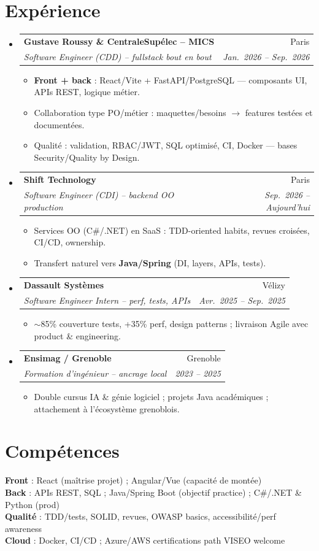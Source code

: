 \documentclass[a4paper,10.5pt]{article}
\makeatletter
\newcommand{\resumeItem}[1]{\item\small{#1}}
\newcommand{\resumeSubheading}[4]{\vspace{3pt}\item\begin{tabular*}{0.97\textwidth}[t]{l@{\extracolsep{\fill}}r}\textbf{#1}&{#2}\\\textit{\small #3}&\textit{\small #4}\\\end{tabular*}\vspace{1pt}}
\newcommand{\resumeSubHeadingListStart}{\begin{itemize}[leftmargin=0.08in,label={}]}
\newcommand{\resumeSubHeadingListEnd}{\end{itemize}}
\makeatother
\begin{document}
\section{Exp\'erience}
\resumeSubHeadingListStart
  \resumeSubheading
    {Gustave Roussy \& CentraleSup\'elec -- MICS}{Paris}
    {Software Engineer (CDD) -- fullstack bout en bout}{Jan.~2026 -- Sep.~2026}
    \begin{itemize}
      \resumeItem{\textbf{Front + back} : React/Vite + FastAPI/PostgreSQL --- composants UI, APIs REST, logique m\'etier.}
      \resumeItem{Collaboration type PO/m\'etier : maquettes/besoins $\rightarrow$ features test\'ees et document\'ees.}
      \resumeItem{Qualit\'e : validation, RBAC/JWT, SQL optimis\'e, CI, Docker --- bases Security/Quality by Design.}
    \end{itemize}
  \resumeSubheading
    {Shift Technology}{Paris}
    {Software Engineer (CDI) -- backend OO production}{Sep.~2026 -- Aujourd'hui}
    \begin{itemize}
      \resumeItem{Services OO (C\#/.NET) en SaaS : TDD-oriented habits, revues crois\'ees, CI/CD, ownership.}
      \resumeItem{Transfert naturel vers \textbf{Java/Spring} (DI, layers, APIs, tests).}
    \end{itemize}
  \resumeSubheading
    {Dassault Syst\`emes}{V\'elizy}
    {Software Engineer Intern -- perf, tests, APIs}{Avr.~2025 -- Sep.~2025}
    \begin{itemize}
      \resumeItem{$\sim$85\% couverture tests, +35\% perf, design patterns ; livraison Agile avec product \& engineering.}
    \end{itemize}
  \resumeSubheading
    {Ensimag / Grenoble}{Grenoble}
    {Formation d'ing\'enieur -- ancrage local}{2023 -- 2025}
    \begin{itemize}
      \resumeItem{Double cursus IA \& g\'enie logiciel ; projets Java acad\'emiques ; attachement \`a l'\'ecosyst\`eme grenoblois.}
    \end{itemize}
\resumeSubHeadingListEnd

\section{Comp\'etences}
\begin{itemize}[leftmargin=0.08in,label={}]\small{\item{
\textbf{Front} : React (ma\^itrise projet) ; Angular/Vue (capacit\'e de mont\'ee) \\
\textbf{Back} : APIs REST, SQL ; Java/Spring Boot (objectif practice) ; C\#/.NET \& Python (prod) \\
\textbf{Qualit\'e} : TDD/tests, SOLID, revues, OWASP basics, accessibilit\'e/perf awareness \\
\textbf{Cloud} : Docker, CI/CD ; Azure/AWS certifications path VISEO welcome
}}\end{itemize}
\end{document}
